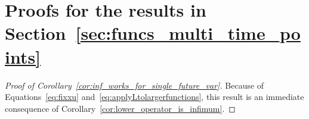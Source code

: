 \documentclass[10pt,a4paper]{paper}
\theoremstyle{definition}
\newcommand{\states}{\mathcal{X}}
\newcommand{\processes}{\mathbb{P}}
\newcommand{\wmprocesses}{\processes^{\mathrm{WM}}}
\newcommand{\gambles}{\mathcal{L}}
\newcommand{\rateset}{\mathcal{Q}}
\newcommand{\norm}[1]{\left\lVert #1 \right\rVert}
\newcommand{\abs}[1]{\left\vert #1 \right\vert}
\begin{document}
\section{Proofs for the results in Section~\ref{sec:funcs_multi_time_points}}

\begin{proof}[Proof of Corollary~\ref{cor:inf_works_for_single_future_var}]
Because of Equations~\eqref{eq:fixxu} and~\eqref{eq:applyLtolargerfunctions}, this result is an immediate consequence of Corollary~\ref{cor:lower_operator_is_infimum}. 
\end{proof}

%
%
%
\end{document}
